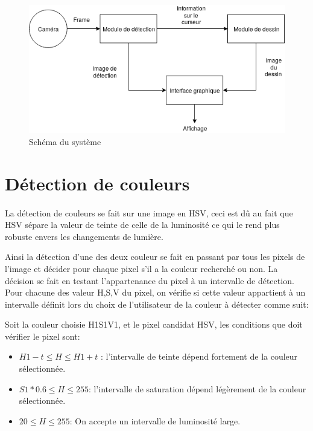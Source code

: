 \documentclass[12pt]{report}
\begin{document}
	\begin{figure}[H]
		\centering
		\includegraphics[scale=0.75]{imgs/MainDiagram.png}
		\caption{Schéma du système}
		\label{fig:SchemaGlob}
	\end{figure}
	
	\section{Détection de couleurs}
	\paragraph{}La détection de couleurs se fait sur une image en HSV, ceci est dû au fait que HSV sépare la valeur de teinte de celle de la luminosité ce qui le rend plus robuste envers les changements de lumière. 
	
	Ainsi la détection d’une des deux couleur se fait en passant par tous les pixels de l’image et décider pour chaque pixel s’il a la couleur recherché ou non. La décision se fait en testant l’appartenance du pixel à un intervalle de détection. Pour chacune des valeur H,S,V du pixel, on vérifie si cette valeur appartient à un intervalle définit lors du choix de l’utilisateur de la couleur à détecter comme suit: 
	
	Soit la couleur choisie H1S1V1, et le pixel candidat HSV, les conditions que doit vérifier le pixel sont:
	\begin{itemize}
		\item $H1-t \leq H \leq H1+t$ : l’intervalle de teinte dépend fortement de la couleur sélectionnée.
		
		\item $S1*0.6 \leq H \leq 255$: l’intervalle de saturation dépend légèrement de la couleur sélectionnée.
		
		\item $20 \leq H \leq 255$: On accepte un intervalle de luminosité large.
	\end{itemize}
\end{document}
